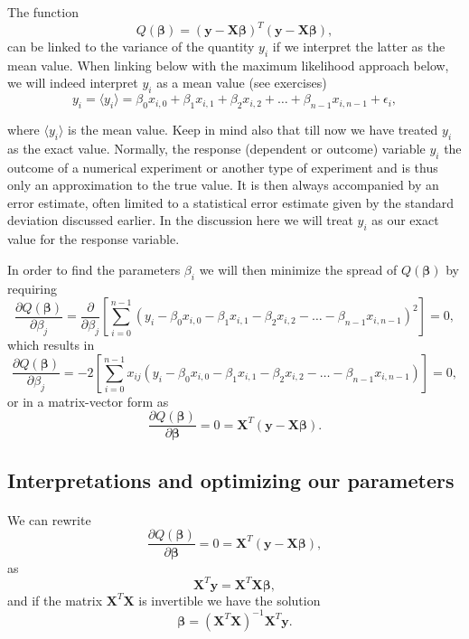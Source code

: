 \documentclass[%
oneside,                 %
final,                   %
10pt]{article}
\begin{document}
The function 
\[
Q(\bm{\beta})=\left(\bm{y}-\bm{X}\bm{\beta}\right)^T\left(\bm{y}-\bm{X}\bm{\beta}\right),
\]
can be linked to the variance of the quantity $y_i$ if we interpret the latter as the mean value. 
When linking below with the maximum likelihood approach below, we will indeed interpret $y_i$ as a mean value (see exercises)
\[
y_{i}=\langle y_i \rangle = \beta_0x_{i,0}+\beta_1x_{i,1}+\beta_2x_{i,2}+\dots+\beta_{n-1}x_{i,n-1}+\epsilon_i,
\]

where $\langle y_i \rangle$ is the mean value. Keep in mind also that
till now we have treated $y_i$ as the exact value. Normally, the
response (dependent or outcome) variable $y_i$ the outcome of a
numerical experiment or another type of experiment and is thus only an
approximation to the true value. It is then always accompanied by an
error estimate, often limited to a statistical error estimate given by
the standard deviation discussed earlier. In the discussion here we
will treat $y_i$ as our exact value for the response variable.

In order to find the parameters $\beta_i$ we will then minimize the spread of $Q(\bm{\beta})$ by requiring
\[
\frac{\partial Q(\bm{\beta})}{\partial \beta_j} = \frac{\partial }{\partial \beta_j}\left[ \sum_{i=0}^{n-1}\left(y_i-\beta_0x_{i,0}-\beta_1x_{i,1}-\beta_2x_{i,2}-\dots-\beta_{n-1}x_{i,n-1}\right)^2\right]=0, 
\]
which results in
\[
\frac{\partial Q(\bm{\beta})}{\partial \beta_j} = -2\left[ \sum_{i=0}^{n-1}x_{ij}\left(y_i-\beta_0x_{i,0}-\beta_1x_{i,1}-\beta_2x_{i,2}-\dots-\beta_{n-1}x_{i,n-1}\right)\right]=0, 
\]
or in a matrix-vector form as
\[
\frac{\partial Q(\bm{\beta})}{\partial \bm{\beta}} = 0 = \bm{X}^T\left( \bm{y}-\bm{X}\bm{\beta}\right).  
\]




\subsection*{Interpretations and optimizing our parameters}

\paragraph{}
We can rewrite
\[
\frac{\partial Q(\bm{\beta})}{\partial \bm{\beta}} = 0 = \bm{X}^T\left( \bm{y}-\bm{X}\bm{\beta}\right),  
\]
as
\[
\bm{X}^T\bm{y} = \bm{X}^T\bm{X}\bm{\beta},  
\]
and if the matrix $\bm{X}^T\bm{X}$ is invertible we have the solution
\[
\bm{\beta} =\left(\bm{X}^T\bm{X}\right)^{-1}\bm{X}^T\bm{y}.
\]
\end{document}

